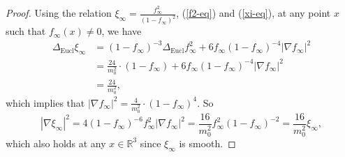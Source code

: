 \documentclass[letter]{amsart}
\theoremstyle{definition}
\theoremstyle{remark}
\begin{document}
\begin{proof}
	Using the relation $\xi _\infty = \frac{f_\infty^2}{(1-f_\infty)^2}$, (\ref{f2-eq}) and (\ref{xi-eq}), at any point $x$ such that $f_\infty(x) \neq 0$, we have
	\begin{align*}
		\Delta _{\mathrm{Eucl} } \xi _\infty &= (1-f_\infty)^{-3}\Delta _{\mathrm{Eucl}} f_\infty^2 + 6f_\infty(1-f_\infty)^{-4} |\nabla f_\infty|^2\\
		&= \frac{24}{m_0^2} \cdot (1-f_\infty)+ 6f_\infty(1-f_\infty)^{-4} |\nabla f_\infty|^2\\
		&= \frac{24}{m_0^2},
	\end{align*}
	which implies that $|\nabla f_\infty|^2= \frac{4}{m_0^2}\cdot (1-f_\infty)^4$. So 
	$$|\nabla \xi _\infty|^2 = 4(1-f_\infty)^{-6}f_\infty^2|\nabla f_\infty|^2= \frac{16}{m_0^2} f_\infty^2(1-f_\infty)^{-2} = \frac{16}{m_0^2} \xi _\infty,$$
	which also holds at any $ x \in \mathbb{R}^3$ since $\xi _\infty$ is smooth. 


\end{proof}
\end{document}
